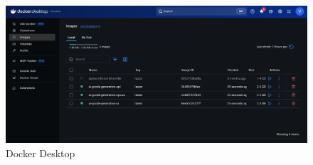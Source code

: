 \begin{figure}
	\begin{center}
		\includegraphics[width=1\linewidth]{Images/docker.png}
		\caption{Docker Desktop}
		\label{Docker} 
	\end{center}
\end{figure}
